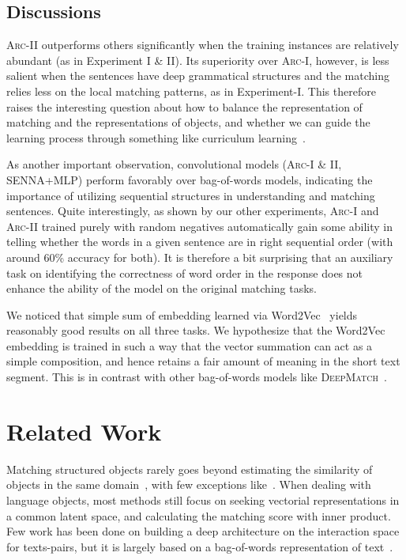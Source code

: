 \documentclass{article} %
\begin{document}
\subsection{Discussions}\vspace{-10pt}
\textsc{Arc-II} outperforms others significantly when the training instances are relatively abundant (as in Experiment I \& II). Its superiority over \textsc{Arc-I}, however,  is less salient when the sentences have deep grammatical structures and the matching relies less on the local matching patterns, as in Experiment-I. This therefore raises the interesting question about how to balance the representation of matching and the representations of objects, and whether we can guide the learning process through something like curriculum learning~\cite{CL}.

As another important observation, convolutional models (\textsc{Arc-I} \& II, \textsc{SENNA+MLP}) perform favorably over bag-of-words models, indicating the importance of utilizing sequential structures in understanding and matching sentences. Quite interestingly, as shown by our other experiments, \textsc{Arc-I} and \textsc{Arc-II} trained purely with random negatives automatically gain some ability in telling whether the words in a given sentence are in right sequential order (with around 60\% accuracy for both). It is therefore a bit surprising that an auxiliary task on identifying the correctness of word order in the response does not enhance the ability of the model on the original matching tasks.

We noticed that simple sum of embedding learned via Word2Vec~\cite{word2vec} yields reasonably good results on all three tasks. We hypothesize that the Word2Vec embedding is trained in such a way that the vector summation can act as a simple composition, and hence retains a fair amount of meaning in the short text segment. This is in contrast with other bag-of-words models like \textsc{DeepMatch}~\cite{nipsmatch}. \vspace{-8pt}

\section{Related Work} \label{s:related}\vspace{-10pt}

Matching structured objects rarely goes beyond estimating the similarity of objects in the same domain~\cite{Sun_2013_ICCV,VishproG,socher2011}, with few exceptions like~\cite{bordes2014semantic,Shenwww2014}. When dealing with language objects, most methods still focus on seeking vectorial representations in a common latent space, and calculating the matching score with inner product\cite{Shenwww2014,baoxunACL}. Few work has been done on building a deep architecture on the interaction space for texts-pairs, but it is largely based on a bag-of-words representation of text~\cite{nipsmatch}.
\end{document}
